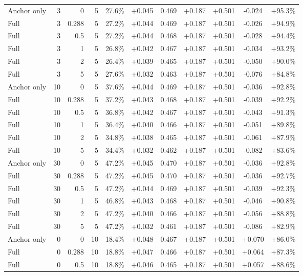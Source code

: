 \begin{table}[htbp]
\begin{tabular}{lrrrccccccc}
Anchor only & 3 & 0 & 5 & 27.6\% & +0.045 & 0.469 & +0.187 & +0.501 & -0.024 & +95.3\% \\
Full & 3 & 0.288 & 5 & 27.2\% & +0.044 & 0.469 & +0.187 & +0.501 & -0.026 & +94.9\% \\
Full & 3 & 0.5 & 5 & 27.2\% & +0.044 & 0.468 & +0.187 & +0.501 & -0.028 & +94.4\% \\
Full & 3 & 1 & 5 & 26.8\% & +0.042 & 0.467 & +0.187 & +0.501 & -0.034 & +93.2\% \\
Full & 3 & 2 & 5 & 26.4\% & +0.039 & 0.465 & +0.187 & +0.501 & -0.050 & +90.0\% \\
Full & 3 & 5 & 5 & 27.6\% & +0.032 & 0.463 & +0.187 & +0.501 & -0.076 & +84.8\% \\
Anchor only & 10 & 0 & 5 & 37.6\% & +0.044 & 0.469 & +0.187 & +0.501 & -0.036 & +92.8\% \\
Full & 10 & 0.288 & 5 & 37.2\% & +0.043 & 0.468 & +0.187 & +0.501 & -0.039 & +92.2\% \\
Full & 10 & 0.5 & 5 & 36.8\% & +0.042 & 0.467 & +0.187 & +0.501 & -0.043 & +91.3\% \\
Full & 10 & 1 & 5 & 36.4\% & +0.040 & 0.466 & +0.187 & +0.501 & -0.051 & +89.8\% \\
Full & 10 & 2 & 5 & 34.8\% & +0.038 & 0.465 & +0.187 & +0.501 & -0.061 & +87.9\% \\
Full & 10 & 5 & 5 & 34.4\% & +0.032 & 0.462 & +0.187 & +0.501 & -0.082 & +83.6\% \\
Anchor only & 30 & 0 & 5 & 47.2\% & +0.045 & 0.470 & +0.187 & +0.501 & -0.036 & +92.8\% \\
Full & 30 & 0.288 & 5 & 47.2\% & +0.045 & 0.470 & +0.187 & +0.501 & -0.036 & +92.7\% \\
Full & 30 & 0.5 & 5 & 47.2\% & +0.044 & 0.469 & +0.187 & +0.501 & -0.039 & +92.3\% \\
Full & 30 & 1 & 5 & 46.8\% & +0.043 & 0.468 & +0.187 & +0.501 & -0.046 & +90.8\% \\
Full & 30 & 2 & 5 & 47.2\% & +0.040 & 0.466 & +0.187 & +0.501 & -0.056 & +88.8\% \\
Full & 30 & 5 & 5 & 47.2\% & +0.032 & 0.461 & +0.187 & +0.501 & -0.086 & +82.9\% \\
Anchor only & 0 & 0 & 10 & 18.4\% & +0.048 & 0.467 & +0.187 & +0.501 & +0.070 & +86.0\% \\
Full & 0 & 0.288 & 10 & 18.8\% & +0.047 & 0.466 & +0.187 & +0.501 & +0.064 & +87.3\% \\
Full & 0 & 0.5 & 10 & 18.8\% & +0.046 & 0.465 & +0.187 & +0.501 & +0.057 & +88.6\% \\

\end{tabular}
\end{table}

